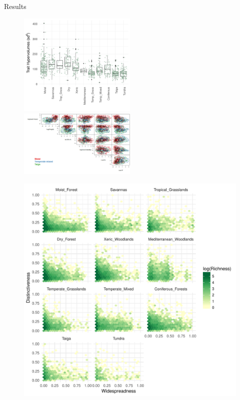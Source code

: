 \documentclass[final]{beamer}
\newlength{\onecolwid}
\begin{document}
\begin{frame}[t]
\begin{columns}[t]
\begin{column}{\onecolwid}
		 \begin{block}{Results}

\begin{figure}[h]
	\centering
	\includegraphics[width=0.5\textwidth]{./figures/Hypervolume_sp_sample_gaussian20perc.pdf}
	~
	\includegraphics[width=0.5\textwidth]{./figures/Hypervolumes.png}
	\caption{}
	\label{}
\end{figure}

\begin{figure}[h]
	\centering
	\includegraphics[scale=0.7]{./figures/All_biomes_heatmap_logTraits.pdf}
	\caption{}
	\label{}
\end{figure}






\end{block}
\end{column}
\end{columns}
\end{frame}
\end{document}
